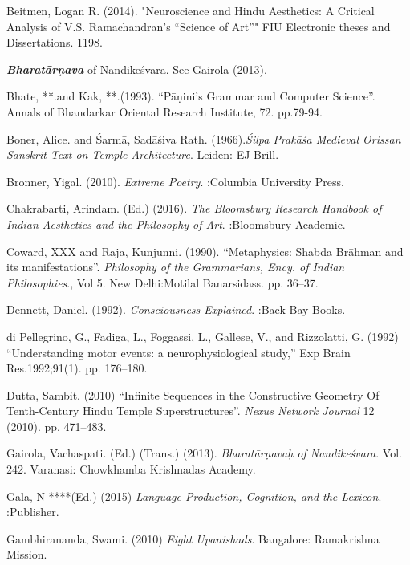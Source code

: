 \begin{thebibliography}{99}
\itemsep=2pt
Beitmen, Logan R. (2014). "Neuroscience and Hindu Aesthetics: A Critical Analysis of V.S. Ramachandran’s “Science of Art”" FIU Electronic theses and Dissertations. 1198.

{\sl\bfseries Bharatārṇava} of Nandikeśvara. See Gairola (2013).

Bhate, **.and Kak, **.(1993). “Pāṇini’s Grammar and Computer Science”. Annals of Bhandarkar Oriental Research Institute, 72. pp.79-94.

Boner, Alice. and Śarmā, Sadāśiva Rath. (1966).\textsl{Śilpa Prakāśa Medieval Orissan Sanskrit Text on Temple Architecture}. Leiden: EJ Brill.

Bronner, Yigal. (2010). \textsl{Extreme Poetry}. :Columbia University Press.

Chakrabarti, Arindam. (Ed.) (2016). \textsl{The Bloomsbury Research Handbook of Indian Aesthetics and the Philosophy of Art}. :Bloomsbury Academic.

Coward, XXX and Raja, Kunjunni. (1990). “Metaphysics: Shabda Brāhman and its manifestations”. \textsl{Philosophy of the Grammarians, Ency. of Indian Philosophies}., Vol 5. New Delhi:Motilal Banarsidass. pp. 36--37.

Dennett, Daniel. (1992). \textsl{Consciousness Explained}. :Back Bay Books.

di Pellegrino, G., Fadiga, L., Foggassi, L., Gallese, V., and Rizzolatti, G. (1992) “Understanding motor events: a neurophysiological study,” Exp Brain Res.1992;91(1). pp. 176--180.

Dutta, Sambit. (2010) “Infinite Sequences in the Constructive Geometry Of Tenth-Century Hindu Temple  Superstructures”. \textsl{Nexus Network Journal} 12 (2010). pp. 471--483.

Gairola, Vachaspati. (Ed.) (Trans.) (2013). \textsl{Bharatārṇavaḥ of Nandikeśvara}. Vol. 242. Varanasi: Chowkhamba Krishnadas Academy.

Gala, N ****(Ed.) (2015) \textsl{Language Production, Cognition, and the Lexicon}. :Publisher.

Gambhirananda, Swami. (2010) \textsl{Eight Upanishads}. Bangalore: Ramakrishna Mission.


\end{thebibliography}
